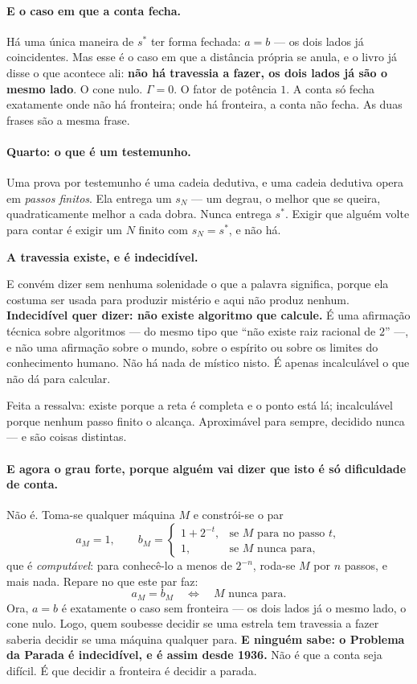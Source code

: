 \documentclass[11pt]{article}
\theoremstyle{plain}
\theoremstyle{remark}
\begin{document}
\paragraph{E o caso em que a conta fecha.} Há uma única maneira de $s^{*}$ ter
forma fechada: $a=b$ --- os dois lados já coincidentes. Mas esse é o caso em que
a distância própria se anula, e o livro já disse o que acontece ali:
\textbf{não há travessia a fazer, os dois lados já são o mesmo lado}. O cone
nulo. $\Gamma=0$. O fator de potência $1$. A conta só fecha exatamente onde não
há fronteira; onde há fronteira, a conta não fecha. As duas frases são a mesma
frase.

\paragraph{Quarto: o que é um testemunho.} Uma prova por testemunho é uma cadeia
dedutiva, e uma cadeia dedutiva opera em \emph{passos finitos}. Ela entrega um
$s_N$ --- um degrau, o melhor que se queira, quadraticamente melhor a cada
dobra. Nunca entrega $s^{*}$. Exigir que alguém volte para contar é exigir um
$N$ finito com $s_N=s^{*}$, e não há.

\begin{center}
\textbf{A travessia existe, e é indecidível.}
\end{center}

\noindent E convém dizer sem nenhuma solenidade o que a palavra significa, porque
ela costuma ser usada para produzir mistério e aqui não produz nenhum.
\textbf{Indecidível quer dizer: não existe algoritmo que calcule.} É uma
afirmação técnica sobre algoritmos --- do mesmo tipo que ``não existe raiz
racional de $2$'' ---, e não uma afirmação sobre o mundo, sobre o espírito ou
sobre os limites do conhecimento humano. Não há nada de místico nisto. É apenas
incalculável o que não dá para calcular.

\medskip
\noindent Feita a ressalva: existe porque a reta é completa e o ponto está lá;
incalculável porque nenhum passo finito o alcança. Aproximável para sempre,
decidido nunca --- e são coisas distintas.

\paragraph{E agora o grau forte, porque alguém vai dizer que isto é só
dificuldade de conta.} Não é. Toma-se qualquer máquina $M$ e constrói-se o par
\[
 a_M=1,\qquad
 b_M=\begin{cases}
 1+2^{-t}, & \text{se } M \text{ para no passo } t,\\[2pt]
 1, & \text{se } M \text{ nunca para,}
 \end{cases}
\]
que é \emph{computável}: para conhecê-lo a menos de $2^{-n}$, roda-se $M$ por $n$
passos, e mais nada. Repare no que este par faz:
\[
 a_M=b_M \quad\Longleftrightarrow\quad M \text{ nunca para.}
\]
Ora, $a=b$ é exatamente o caso sem fronteira --- os dois lados já o mesmo lado, o
cone nulo. Logo, quem soubesse decidir se uma estrela tem travessia a fazer
saberia decidir se uma máquina qualquer para. \textbf{E ninguém sabe: o Problema
da Parada é indecidível, e é assim desde 1936.} Não é que a conta seja difícil.
É que decidir a fronteira é decidir a parada.
\end{document}

